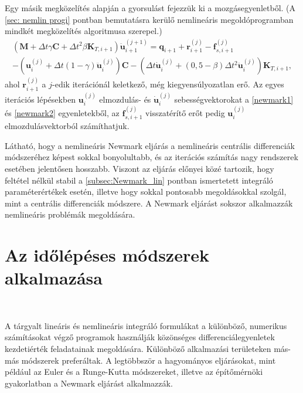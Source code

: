 Egy másik megközelítés alapján a gyorsulást fejezzük ki  a mozgásegyenletből. (A \ref{sec: nemlin progi} pontban bemutatásra kerülő nemlineáris megoldóprogramban mindkét megközelítés algoritmusa szerepel.)
\begin{equation}
\begin{split}
\left( \mathbf{M}+\Delta{t}\gamma\mathbf{C}+\Delta{t}^2\beta\mathbf{K}_{T,i+1}\right)\mathbf{\ddot{u}}_{i+1}^{(j+1)} = \mathbf{q}_{i+1} + \mathbf{r}_{i+1}^{(j)}-\mathbf{f}_{s,i+1}^{(j)}\\-\left(\mathbf{u}_i^{(j)}+\Delta{t}(1-\gamma)\mathbf{\ddot{u}}_i^{(j)}\right)\mathbf{C}-\left(\Delta{t}\mathbf{\dot{u}}_i^{(j)}+(0,5-\beta)\Delta{t}^2\mathbf{\ddot{u}}_i^{(j)}\right)\mathbf{K}_{T,i+1},
\end{split}
\end{equation}
ahol $\mathbf{r}_{i+1}^{(j)}$ a $j$-edik iterációnál keletkező, még kiegyensúlyozatlan erő. Az egyes iterációs lépésekben $\mathbf{u}_i^{(j)}$ elmozdulás- és $\mathbf{\dot{u}}_i^{(j)}$ sebességvektorokat a \eqref{newmark1} és \eqref{newmark2} egyenletekből, az $\mathbf{f}_{s,i+1}^{(j)}$ visszatérítő erőt pedig  $\mathbf{u}_i^{(j)}$ elmozdulásvektorból számíthatjuk.

Látható, hogy a nemlineáris Newmark eljárás a nemlineáris centrális differenciák módszeréhez képest sokkal bonyolultabb, és az iterációs számítás nagy rendszerek esetében jelentősen hosszabb. Viszont az eljárás előnyei közé tartozik, hogy feltétel nélkül stabil a \ref{subsec:Newmark_lin} pontban ismertetett integráló paraméterértékek esetén, illetve hogy  sokkal  pontosabb megoldásokkal szolgál, mint a centrális differenciák módszere. A Newmark eljárást sokszor alkalmazzák nemlineáris problémák megoldására.



\section{Az időlépéses módszerek alkalmazása}

{\ }

A tárgyalt lineáris és nemlineáris integráló formulákat a különböző, numerikus számításokat végző  programok használják közönséges differenciálegyenletek kezdetiérték feladatainak megoldására.  Különböző alkalmazási területeken más-más módszerek preferáltak. A legtöbbször a hagyományos eljárásokat, mint például  az Euler és a Runge-Kutta módszereket, illetve az építőmérnöki gyakorlatban a Newmark eljárást alkalmazzák.


